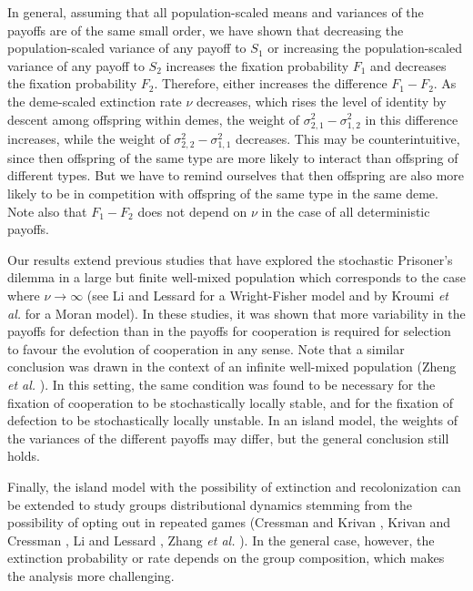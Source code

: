 \documentclass[11pt]{article}
\begin{document}
In general, assuming that all population-scaled means and variances of the payoffs are of the same small order, we have shown that decreasing the population-scaled variance of any payoff to $S_1$  or increasing the population-scaled variance of any payoff to $S_2$ increases the fixation probability $F_1$ and decreases the fixation probability $F_2$. Therefore, either increases the difference $F_1-F_2$. 
As the deme-scaled extinction rate $\nu$ decreases, which rises the level of identity by descent among offspring within demes, the weight of $\sigma_{2,1}^2-\sigma_{1,2}^2$ in this difference increases, while the weight of $\sigma_{2,2}^2-\sigma_{1,1}^2$ decreases. This may be counterintuitive, since then offspring of the same type are more likely to interact than offspring of different types. But we have to remind ourselves that then offspring are also more likely to be in competition with offspring of the same type in the same deme. Note also that $F_1-F_2$ does not depend on $\nu$ in the case of all deterministic payoffs. 

 
 Our results extend previous studies that have explored the stochastic Prisoner's dilemma in a large but finite well-mixed population which corresponds to the case where $\nu \rightarrow \infty$ (see Li and Lessard \cite{LL2020} for a Wright-Fisher model and by Kroumi \textit{et al.} \cite{KMLL2021} for a Moran model). In these studies, it was shown that more variability in the payoffs for defection than in the payoffs for cooperation is required for selection to favour the evolution of cooperation in any sense. Note that
a similar conclusion was drawn in the context of an infinite well-mixed population  (Zheng \textit{et al.} \cite{ZLLT2018,ZLLT2017}). In this setting, the same condition was found to be necessary  for the fixation of cooperation  to be stochastically locally stable, and for the fixation of defection  to be stochastically locally unstable. In an island model, the weights of the variances of the different payoffs may differ, but the general conclusion still holds.

Finally, the island model with the possibility of extinction and recolonization can be extended to study groups distributional dynamics stemming from the possibility of opting out in repeated games  (Cressman and Krivan \cite{CK2022}, Krivan and Cressman \cite{KC2020}, Li and Lessard \cite{LL2021}, Zhang \emph{et al.} \cite{Zetal2016}). In the general case, however, the extinction probability or rate depends on the group composition, which makes the analysis more challenging.
\end{document}
